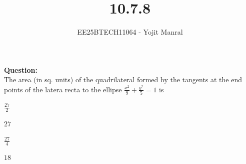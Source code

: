 \documentclass[journal]{IEEEtran}
\begin{document}

\vspace{3cm}

\title{10.7.8}
\author{EE25BTECH11064 - Yojit Manral}

\maketitle
{\let\newpage\relax\maketitle}
\renewcommand{\thefigure}{\theenumi}
\renewcommand{\thetable}{\theenumi}
\setlength{\intextsep}{10pt} %

\textbf{Question:}\\
The area (in sq. units) of the quadrilateral formed by the tangents at the end points of the latera recta to the ellipse $\frac{x^2}{9} + \frac{y^2}{5} = 1$ is
\begin{enumerate}[label=(\alph*)]
\begin{multicols}{4}
    \item $\frac{27}{2}$
    \item $27$
    \item $\frac{27}{4}$
    \item $18$
\end{multicols}
\end{enumerate}
\end{document}
